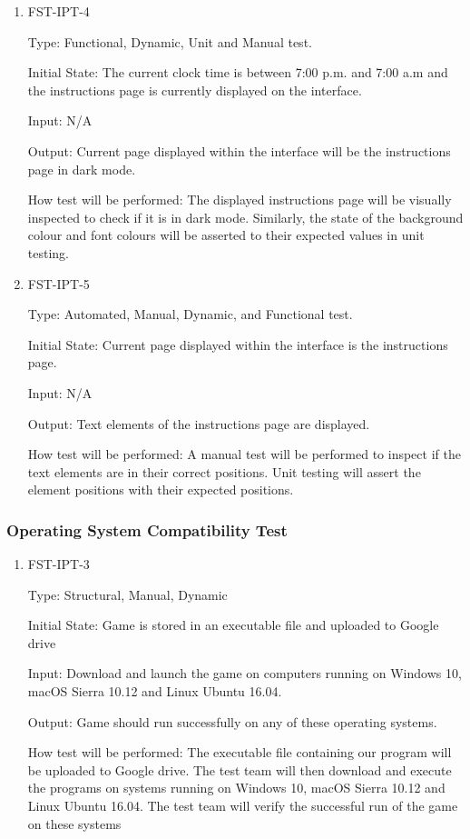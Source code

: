 \documentclass[12pt, titlepage]{article}
\begin{document}
\begin{enumerate}
\item{FST-IPT-4\\}

Type: Functional, Dynamic, Unit and Manual test.
					
Initial State:  The current clock time is between 7:00 p.m. and 7:00 a.m and the instructions page is currently displayed on the interface.
					
Input: N/A
					
Output: Current page displayed within the interface will be the instructions page in dark mode.
					
How test will be performed: The displayed instructions page will be visually inspected to check if it is in dark mode. Similarly, the state of the background colour and font colours will be asserted to their expected values in unit testing. 


\item{FST-IPT-5\\}

Type: Automated, Manual, Dynamic, and Functional test.
					
Initial State: Current page displayed within the interface is the instructions page.
					
Input: N/A
					
Output: Text elements of the instructions page are displayed.
					
How test will be performed: A manual test will be performed to inspect if the text elements are in their correct positions. Unit testing will assert the element positions with their expected positions. 

\end{enumerate}

\subsubsection{Operating System Compatibility Test}

\begin{enumerate}

\item{FST-IPT-3\\}

Type: Structural, Manual, Dynamic
					
Initial State: Game is stored in an executable file and uploaded to Google drive
					
Input: Download and launch the game on computers running on  Windows 10, macOS Sierra 10.12 and Linux Ubuntu 16.04.
					
Output: Game should run successfully on any of these operating systems.
					
How test will be performed: The executable file containing our program will be uploaded to Google drive.
The test team will then download and execute the programs on systems running on Windows 10, macOS Sierra 10.12 and Linux Ubuntu 16.04. The test team will verify the successful run of the game on these systems
\end{enumerate}
\end{document}
